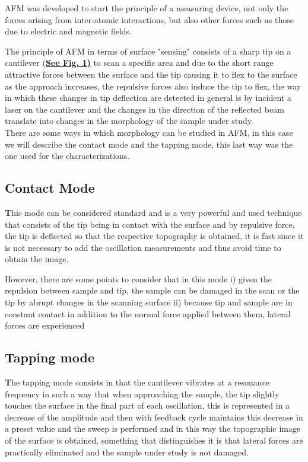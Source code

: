 AFM was developed to start the principle of a measuring device, not only the forces arising from inter-atomic interactions, but also other forces such as those due to electric and magnetic fields\cite{binnig1986atomic}.


The principle of AFM in terms of surface "sensing" consists of a sharp tip on a cantilever (\textbf{\underline{See Fig. 1)}} to scan a specific area and due to the short range attractive forces between the surface and the tip causing it to flex to the surface as the approach increases, the repulsive forces also induce the tip to flex, the way in which these changes in tip deflection are detected in general is by incident a laser on the cantilever and the changes in the direction of the reflected beam translate into changes in the morphology of the sample under study.  \\
There are some ways in which morphology can be studied in AFM, in this case we will describe the contact mode and the tapping mode, this last way was the one used for the characterizations.

\subsection{Contact Mode} 
\vspace{-1cm}
\lettrine[lines=3, lraise=0.1, nindent=0mm, slope=0mm]{\textbf{T}}{}his mode can be considered standard and is a very powerful and used technique that consists of the tip being in contact with the surface and by repulsive force, the tip is deflected so that the respective topography is obtained, it is fast since it is not necessary to add the oscillation measurements and thus avoid time to obtain the image. 

However, there are some points to consider that in this mode i) given the repulsion between sample and tip, the sample can be damaged in the scan or the tip by abrupt changes in the scanning surface ii) because tip and sample are in constant contact in addition to the normal force applied between them, lateral forces are experienced \cite{eaton2010atomic, cricenti2003afm, aranha2018fabrication} 


\subsection{Tapping mode}
\vspace{-1cm}
\lettrine[lines=3, lraise=0.1, nindent=0mm, slope=0mm]{\textbf{T}}{}he tapping mode consists in that the cantilever vibrates at a resonance frequency in such a way that when approaching the sample, the tip slightly touches the surface in the final part of each oscillation, this is represented in a decrease of the amplitude and then with feedback cycle maintains this decrease in a preset value and the sweep is performed and in this way the topographic image of the surface is obtained, something that distinguishes it is that lateral forces are practically eliminated and the sample under study is not damaged\cite{putman1994tapping,cleveland1998energy}. 




